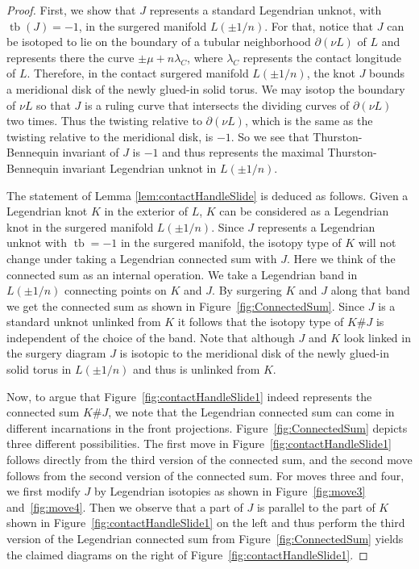 \documentclass[11pt]{amsart} %
\DeclareMathOperator{\tb}{tb}
\theoremstyle{plain}
\theoremstyle{definition}
\begin{document}
\begin{proof}
	First, we show that $J$ represents a standard Legendrian unknot, with $\tb(J)=-1$, in the surgered manifold $L(\pm1/n)$. For that, notice that $J$ can be isotoped to lie on the boundary of a tubular neighborhood $\partial(\nu L)$ of $L$ and represents there the curve $\pm\mu+n\lambda_C$, where $\lambda_C$ represents the contact longitude of $L$. Therefore, in the contact surgered manifold $L(\pm1/n)$, the knot $J$ bounds a meridional disk of the newly glued-in solid torus. We may isotop the boundary of $\nu L$ so that $J$ is a ruling curve that intersects the dividing curves of $\partial (\nu L)$ two times. Thus the twisting relative to $\partial (\nu L)$, which is the same as the twisting relative to the meridional disk, is $-1$. So we see that Thurston-Bennequin invariant of $J$ is $-1$  and thus represents the maximal Thurston-Bennequin invariant Legendrian unknot in $L(\pm1/n)$.
	
The statement of Lemma \ref{lem:contactHandleSlide} is deduced as follows. Given a Legendrian knot $K$ in the exterior of $L$, $K$ can be considered as a Legendrian knot in the surgered manifold $L(\pm1/n)$. Since $J$ represents a Legendrian unknot with $\tb=-1$ in the surgered manifold, the isotopy type of $K$ will not change under taking a Legendrian connected sum with $J$. Here we think of the connected sum as an internal operation. We take a Legendrian band in $L(\pm1/n)$ connecting points on $K$ and $J$. By surgering $K$ and $J$ along that band we get the connected sum as shown in Figure~\ref{fig:ConnectedSum}. Since $J$ is a standard unknot unlinked from $K$ it follows that the isotopy type of $K\#J$ is independent of the choice of the band. Note that although $J$ and $K$ look linked in the surgery diagram $J$ is isotopic to the meridional disk of the newly glued-in solid torus in $L(\pm1/n)$ and thus is unlinked from $K$.

Now, to argue that Figure~\ref{fig:contactHandleSlide1} indeed represents the connected sum $K\#J$, we note that the Legendrian connected sum can come in different incarnations in the front projections. Figure~\ref{fig:ConnectedSum} depicts three different possibilities. The first move in Figure~\ref{fig:contactHandleSlide1} follows directly from the third version of the connected sum, and the second move follows from the second version of the connected sum. For moves three and four, we first modify $J$ by Legendrian isotopies as shown in Figure~\ref{fig:move3} and~\ref{fig:move4}. Then we observe that a part of $J$ is parallel to the part of $K$ shown in Figure~\ref{fig:contactHandleSlide1} on the left and thus perform the third version of the Legendrian connected sum from Figure~\ref{fig:ConnectedSum} yields the claimed diagrams on the right of Figure~\ref{fig:contactHandleSlide1}.
\end{proof}
\end{document}
